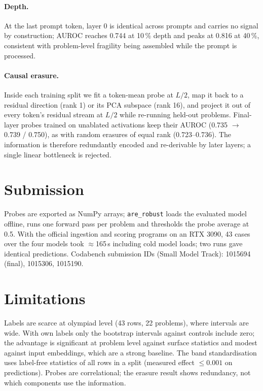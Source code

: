 \documentclass[10pt]{article}
\begin{document}
\paragraph{Depth.} At the last prompt token, layer 0 is identical across prompts and carries no signal by construction; AUROC reaches 0.744 at 10\,\% depth and peaks at 0.816 at 40\,\%, consistent with problem-level fragility being assembled while the prompt is processed.

\paragraph{Causal erasure.} Inside each training split we fit a token-mean probe at $L/2$, map it back to a residual direction (rank 1) or its PCA subspace (rank 16), and project it out of every token's residual stream at $L/2$ while re-running held-out problems. Final-layer probes trained on unablated activations keep their AUROC (0.735 $\to$ 0.739 / 0.750), as with random erasures of equal rank (0.723--0.736). The information is therefore redundantly encoded and re-derivable by later layers; a single linear bottleneck is rejected.

\section{Submission}
Probes are exported as NumPy arrays; \texttt{are\_robust} loads the evaluated model offline, runs one forward pass per problem and thresholds the probe average at 0.5. With the official ingestion and scoring programs on an RTX 3090, 43 cases over the four models took $\approx$165\,s including cold model loads; two runs gave identical predictions. Codabench submission IDs (Small Model Track): 1015694 (final), 1015306, 1015190.

\section*{Limitations}
Labels are scarce at olympiad level (43 rows, 22 problems), where intervals are wide. With own labels only the bootstrap intervals against controls include zero; the advantage is significant at problem level against surface statistics and modest against input embeddings, which are a strong baseline. The band standardisation uses label-free statistics of all rows in a split (measured effect $\le0.001$ on predictions). Probes are correlational; the erasure result shows redundancy, not which components use the information.
\end{document}
